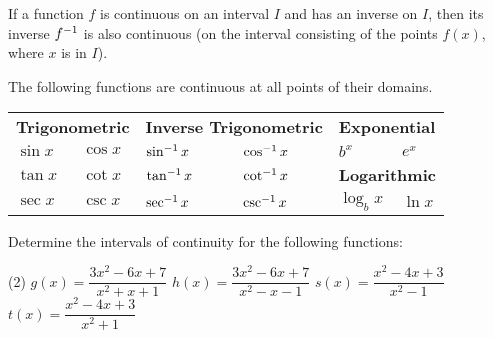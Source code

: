 \documentclass[../mathNotesPreamble]{subfiles}
\begin{document}
  \begin{thmBox*}
    If a function $f$ is continuous on an interval $I$ and has an inverse on $I$, then its inverse $f^{-1}$ is also continuous (on the interval consisting of the points $f(x)$, where $x$ is in $I$).
  \end{thmBox*}

  \vspace*{15pt}
  \begin{thmBox*}
    The following functions are continuous at all points of their domains.
    
    \begin{tabularx}{\linewidth}{*{6}{X}}
      \multicolumn{2}{L}{\textbf{Trigonometric}}& 
      \multicolumn{2}{L}{\textbf{Inverse Trigonometric}}& 
      \multicolumn{2}{L}{\textbf{Exponential}}\\
      $\sin x$& $\cos x$& $\sin^{-1} x$& $\cos^{-1} x$& $b^x$& $e^x$\\
      $\tan x$& $\cot x$& $\tan^{-1} x$& $\cot^{-1} x$& 
      \multicolumn{2}{L}{\textbf{Logarithmic}}\\
      $\sec x$& $\csc x$& $\sec^{-1} x$& $\csc^{-1} x$& $\log_b x$& $\ln x$
    \end{tabularx}
  \end{thmBox*}
  
  \begin{ex*}
    Determine the intervals of continuity for the following functions:
  \end{ex*}
  \begin{tasks}[after-item-skip=\stretch{1}](2)
    \task $g(x)=\dfrac{3x^2-6x+7}{x^2+x+1}$
    \task $h(x)=\dfrac{3x^2-6x+7}{x^2-x-1}$
    \task $s(x)=\dfrac{x^2-4x+3}{x^2-1}$
    \task $t(x)=\dfrac{x^2-4x+3}{x^2+1}$
  \end{tasks}
  \pagebreak
  
\end{document}
